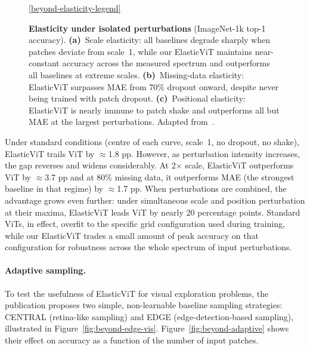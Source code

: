 \begin{figure}[t]
\begin{center}
\begin{small}
\begin{subfigure}[b]{0.32\textwidth}
\caption{}
\label{fig:beyond-shake}
\end{subfigure}
\par\medskip
\ref{beyond-elasticity-legend}
\end{small}
\end{center}
\caption[Elasticity curves for individual perturbations on ImageNet-1k]{\textbf{Elasticity under isolated perturbations} (ImageNet-1k top-1 accuracy). \textbf{(a)}~Scale elasticity: all baselines degrade sharply when patches deviate from scale~1, while our ElasticViT maintains near-constant accuracy across the measured spectrum and outperforms all baselines at extreme scales. \textbf{(b)}~Missing-data elasticity: ElasticViT surpasses MAE from 70\% dropout onward, despite never being trained with patch dropout. \textbf{(c)}~Positional elasticity: ElasticViT is nearly immune to patch shake and outperforms all but MAE at the largest perturbations. Adapted from~.}
\label{fig:beyond-elasticity}
\end{figure}

Under standard conditions (centre of each curve, scale~1, no dropout, no shake), ElasticViT trails ViT by $\approx$1.8 pp. However, as perturbation intensity increases, the gap reverses and widens considerably. At 2$\times$ scale, ElasticViT outperforms ViT by $\approx$3.7 pp and at 80\% missing data, it outperforms MAE (the strongest baseline in that regime) by $\approx$1.7 pp. When perturbations are combined, the advantage grows even further: under simultaneous scale and position perturbation at their maxima, ElasticViT leads ViT by nearly 20 percentage points. Standard ViTs, in effect, overfit to the specific grid configuration used during training, while our ElasticViT trades a small amount of peak accuracy on that configuration for robustness across the whole spectrum of input perturbations.

\paragraph{Adaptive sampling.} To test the usefulness of ElasticViT for visual exploration problems, the publication proposes two simple, non-learnable baseline sampling strategies: CENTRAL (retina-like sampling) and EDGE (edge-detection-based sampling), illustrated in Figure~\ref{fig:beyond-edge-vis}. Figure~\ref{fig:beyond-adaptive} shows their effect on accuracy as a function of the number of input patches.

